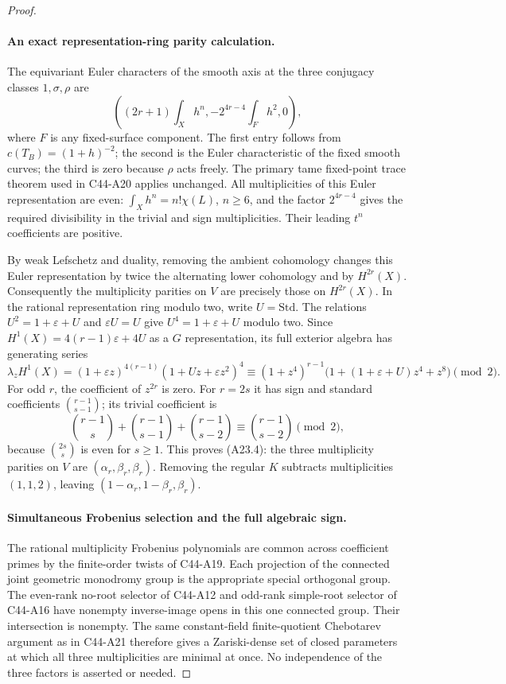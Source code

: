 \documentclass[11pt]{article}
\theoremstyle{remark}\newtheorem{remark}[theorem]{Remark}
\begin{document}
\begin{proof}
\paragraph{An exact representation-ring parity calculation.}
The equivariant Euler characters of the smooth axis at the three
conjugacy classes $1,\sigma,\rho$ are
\[
 \left((2r+1)\int_Xh^n,
              -2^{4r-4}\int_Fh^2,0\right),
 \tag{A23.13}
\]
where $F$ is any fixed-surface component.  The first entry follows
from $c(T_B)=(1+h)^{-2}$; the second is the Euler characteristic of
the fixed smooth curves; the third is zero because $\rho$ acts freely.
The primary tame fixed-point trace theorem used in C44-A20 applies
unchanged.  All multiplicities of this Euler representation are even:
$\int_Xh^n=n!\chi(L)$, $n\geq6$, and the factor $2^{4r-4}$ gives
the required divisibility in the trivial and sign multiplicities.
Their leading $t^n$ coefficients are positive.

By weak Lefschetz and duality, removing the ambient cohomology changes
this Euler representation by twice the alternating lower cohomology
and by $H^{2r}(X)$.  Consequently the multiplicity parities on $V$
are precisely those on $H^{2r}(X)$.
In the rational representation ring modulo two, write $U=\mathrm{Std}$.
The relations $U^2=1+\varepsilon+U$ and $\varepsilon U=U$ give
$U^4=1+\varepsilon+U$ modulo two.  Since
$H^1(X)=4(r-1)\varepsilon+4U$ as a $G$ representation, its full exterior
algebra has generating series
\[
 \lambda_z H^1(X)
   =(1+\varepsilon z)^{4(r-1)}(1+Uz+\varepsilon z^2)^4
   \equiv(1+z^4)^{r-1}
             \bigl(1+(1+\varepsilon+U)z^4+z^8\bigr)\pmod2.
 \tag{A23.14}
\]
For odd $r$, the coefficient of $z^{2r}$ is zero.  For $r=2s$ it has
sign and standard coefficients $\binom{r-1}{s-1}$; its trivial
coefficient is
\[
 \binom{r-1}{s}+\binom{r-1}{s-1}+\binom{r-1}{s-2}
       \equiv\binom{r-1}{s-2}\pmod2,
 \tag{A23.15}
\]
because $\binom{2s}{s}$ is even for $s\geq1$.
This proves (A23.4): the three multiplicity parities on $V$ are
$(\alpha_r,\beta_r,\beta_r)$.
Removing the regular $K$ subtracts multiplicities $(1,1,2)$, leaving
$(1-\alpha_r,1-\beta_r,\beta_r)$.

\paragraph{Simultaneous Frobenius selection and the full algebraic sign.}
The rational multiplicity Frobenius polynomials are common across
coefficient primes by the finite-order twists of C44-A19.
Each projection of the connected joint geometric monodromy group is
the appropriate special orthogonal group.  The even-rank no-root
selector of C44-A12 and odd-rank simple-root selector of C44-A16 have
nonempty inverse-image opens in this one connected group.  Their
intersection is nonempty.  The same constant-field finite-quotient
Chebotarev argument as in C44-A21 therefore gives a Zariski-dense set
of closed parameters at which all three multiplicities are minimal
at once.  No independence of the three factors is asserted or needed.


\end{proof}
\end{document}

